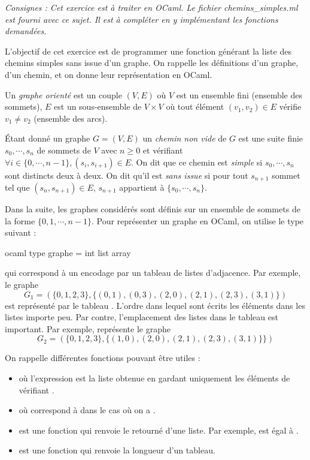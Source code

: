 \documentclass[a4paper, 11pt]{article}
\newenvironment{code-env}
{
  \mdfsetup{
    roundcorner=2pt,
    topline=true,
    leftline=true,
    bottomline=true,
    rightline=true,
    innertopmargin=4pt,
    innerbottommargin=4pt,
    innerrightmargin=4pt,
    innerlinewidth=1pt,
    backgroundcolor={gray!10},
    linecolor={gray!40},
    linewidth=0.1pt,
  }
  \begin{mdframed}[]
  }{\end{mdframed}}
\newenvironment{fancy-code}[1]
  {\VerbatimEnvironment
    \begin{code-env}
    \begin{verbatim}}
 {\end{verbatim}\end{code-env}}
\begin{document}
\textit{Consignes : Cet exercice est à traiter en OCaml. Le fichier \textsf{chemins\_simples.ml} est fourni avec ce sujet. Il est à compléter en y implémentant les fonctions demandées.}


L'objectif de cet exercice est de programmer une fonction générant la liste des chemins simples sans issue d'un graphe. On rappelle les définitions d'un graphe, d'un chemin, et on donne leur représentation en OCaml.


Un \textit{graphe orienté} est un couple $(V,E)$ où  $V$ est un ensemble fini (ensemble des sommets), 
$E$ est un sous-ensemble de  $V\times V$ où  tout élément $(v_1,v_2)\in E$ vérifie  $v_1\neq v_2$ (ensemble des arcs).

\'Etant donné un graphe $G=(V,E)$ un \textit{chemin non vide} de $G$ est une suite finie $s_0,\cdots, s_n $ de sommets de  $V$ avec $n\ge 0$ et vérifiant $\displaystyle{\forall i \in \{0,\cdots ,n-1\}, (s_i,s_{i+1})\in E}$. On dit que ce chemin est \textit{simple} si  $s_0,\cdots , s_{n}$ sont distincts deux à deux. On dit qu'il est \textit{sans issue} si pour tout $s_{n+1}$ sommet tel que $(s_n,s_{n+1})\in E$, $s_{n+1}$ appartient à $\{s_0,\cdots ,s_{n}\}$.


Dans la suite, les graphes considérés sont définis sur un ensemble de sommets de la forme $\{0,1,\cdots , n-1\}$. Pour représenter un graphe en OCaml, on utilise le type suivant :

\medskip

\begin{fancy-code}{ocaml}
  type graphe = int list array
\end{fancy-code}
qui correspond à un encodage par un tableau de listes d'adjacence. Par exemple, le graphe $$G_1=(\{0,1,2,3\},\{(0,1),(0,3),(2,0),(2,1),(2,3),(3,1)\})$$ est représenté par le tableau \mio{[|[1;3];[];[0;1;3];[1]|]}. L'ordre dans lequel sont écrits les éléments dans les listes importe peu. Par contre, l'emplacement des listes dans le tableau est important. Par exemple, \mio{ [|[];[0];[0;3;1];[1]|]} représente le graphe
\[G_2 = (\{0,1,2,3\},\{(1,0),(2,0),(2,1),(2,3),(3,1)\} \})\]

On rappelle différentes fonctions pouvant être utiles :
\begin{itemize}
    \item {} où l'expression  est la liste obtenue en gardant uniquement les éléments  de  vérifiant
        .
    \item {} où 
        correspond à  dans le cas où on a .
    \item {} est une fonction qui renvoie le retourné d'une liste.
        Par exemple,  est égal à \mio{[4;2;2;1;3]}.
    \item {} est une fonction qui renvoie la longueur d'un tableau.
\end{itemize}
\end{document}
